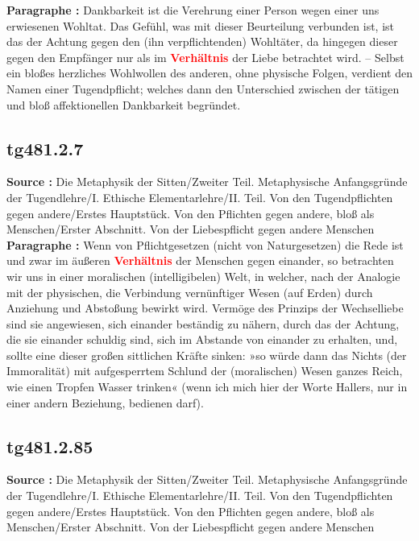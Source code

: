 \documentclass[a4paper,12pt,twoside]{book}
\newcommand{\match}[1]{\textcolor{red}{\textbf{#1}}}
\begin{document}
	\textbf{Paragraphe : }
	Dankbarkeit ist die Verehrung einer Person wegen einer uns erwiesenen Wohltat. Das Gefühl, was mit dieser Beurteilung verbunden ist, ist das der Achtung gegen den (ihn verpflichtenden) Wohltäter, da hingegen dieser gegen den Empfänger nur als im \match{Verhältnis} der Liebe betrachtet wird. – Selbst ein bloßes herzliches Wohlwollen des anderen, ohne physische Folgen, verdient den Namen einer Tugendpflicht; welches dann den Unterschied zwischen der tätigen und bloß affektionellen Dankbarkeit begründet. 
	
	\subsection*{tg481.2.7} 
	\textbf{Source : }Die Metaphysik der Sitten/Zweiter Teil. Metaphysische Anfangsgründe der Tugendlehre/I. Ethische Elementarlehre/II. Teil. Von den Tugendpflichten gegen andere/Erstes Hauptstück. Von den Pflichten gegen andere, bloß als Menschen/Erster Abschnitt. Von der Liebespflicht gegen andere Menschen\\  
	
	\textbf{Paragraphe : }Wenn von Pflichtgesetzen (nicht von Naturgesetzen) die Rede ist und zwar im äußeren \match{Verhältnis} der Menschen gegen einander, so betrachten wir uns in einer moralischen (intelligibelen) Welt, in welcher, nach der Analogie mit der physischen, die Verbindung vernünftiger Wesen (auf Erden) durch Anziehung und Abstoßung bewirkt wird. Vermöge des Prinzips der Wechselliebe sind sie angewiesen, sich einander beständig zu nähern, durch das der Achtung, die sie einander schuldig sind, sich im Abstande von einander zu erhalten, und, sollte eine dieser großen sittlichen Kräfte sinken: »so würde dann das Nichts (der Immoralität) mit aufgesperrtem Schlund der (moralischen) Wesen ganzes Reich, wie einen Tropfen Wasser trinken« (wenn ich mich hier der Worte Hallers, nur in einer andern Beziehung, bedienen darf). 
	
	\subsection*{tg481.2.85} 
	\textbf{Source : }Die Metaphysik der Sitten/Zweiter Teil. Metaphysische Anfangsgründe der Tugendlehre/I. Ethische Elementarlehre/II. Teil. Von den Tugendpflichten gegen andere/Erstes Hauptstück. Von den Pflichten gegen andere, bloß als Menschen/Erster Abschnitt. Von der Liebespflicht gegen andere Menschen\\  
	
\end{document}
